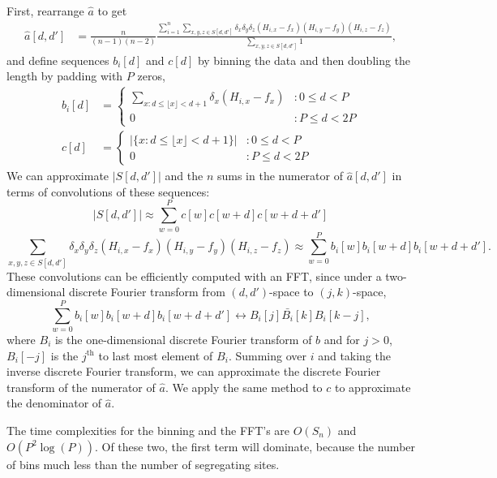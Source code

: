 \documentclass[10pt]{article}
\begin{document}
First, rearrange $\hat{a}$ to get
\begin{align*}
	\hat{a}[d,d'] &=
	\frac{n}{(n-1)(n-2)}
	\frac{
		\sum_{i=1}^n \sum_{x,y,z\in S[d,d']}
		\delta_x \delta_y \delta_z (H_{i,x} - f_x) (H_{i,y} - f_y) (H_{i,z} - f_z)
	}{
		\sum_{x,y,z \in S[d,d']}
		1
	},
\end{align*}
and define sequences $b_i[d]$ and $c[d]$ by binning the data and then doubling
the length by padding with $P$ zeros,
\begin{align*}
	b_i[d] &=
	\left\{
		\begin{array}{ll}
			\sum_{x: d\leq \lfloor{x}\rfloor < d+1} \delta_x(H_{i,x}-f_x) & : 0 \leq d < P\\
			0 & : P\leq d <2P
		\end{array}
	\right.\\
	c[d] &=
	\left\{
		\begin{array}{ll}
			|\{x: d\leq \lfloor{x}\rfloor < d+1\}| & : 0\leq d < P\\
			0 & : P\leq d <2P
		\end{array}
	\right.
\end{align*}
We can approximate $|S[d,d']|$ and the $n$ sums in the numerator of
$\hat{a}[d,d']$ in terms of convolutions of these sequences:
$$
	|S[d,d']| \approx \sum_{w=0}^P c[w]c[w+d]c[w+d+d']
$$
$$
	\sum_{x,y,z\in S[d,d']}
	\delta_x\delta_y\delta_z(H_{i,x}-f_x)(H_{i,y}-f_y)(H_{i,z}-f_z)
	\approx
	\sum_{w=0}^P b_i[w]b_i[w+d]b_i[w+d+d'].
$$
These convolutions can be efficiently
computed with an FFT, since under a two-dimensional discrete Fourier transform
from $(d, d')$-space to $(j, k)$-space,
$$
\sum_{w=0}^P b_i[w]b_i[w+d]b_i[w+d+d']
\leftrightarrow
B_i[j]\bar{B_i}[k]B_i[k-j],
$$
where $B_i$ is the one-dimensional discrete Fourier transform of $b$ and for
$j>0$, $B_i[-j]$ is the $j^\text{th}$ to last most element of $B_i$.
Summing over $i$ and taking the inverse discrete Fourier transform, we can
approximate the discrete Fourier transform of the numerator of $\hat{a}$. We
apply the same method to $c$ to approximate the denominator of $\hat{a}$.

The time complexities for the binning and the FFT's are $O(S_n)$ and
$O(P^2\log(P))$. Of these two, the first term will dominate, because the number
of bins much less than the number of segregating sites.
\end{document}
